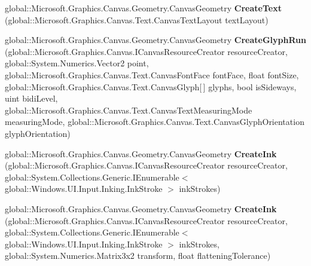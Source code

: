 \begin{DoxyCompactItemize}
\item 
\mbox{\label{interface_microsoft_1_1_graphics_1_1_canvas_1_1_geometry_1_1_i_canvas_geometry_statics_ae56dd9130aab9eb22ebd8e54fc87396e}} 
global\+::\+Microsoft.\+Graphics.\+Canvas.\+Geometry.\+Canvas\+Geometry {\bfseries Create\+Text} (global\+::\+Microsoft.\+Graphics.\+Canvas.\+Text.\+Canvas\+Text\+Layout text\+Layout)
\item 
\mbox{\label{interface_microsoft_1_1_graphics_1_1_canvas_1_1_geometry_1_1_i_canvas_geometry_statics_a8f9a378b73b213c3e0922eb74c733547}} 
global\+::\+Microsoft.\+Graphics.\+Canvas.\+Geometry.\+Canvas\+Geometry {\bfseries Create\+Glyph\+Run} (global\+::\+Microsoft.\+Graphics.\+Canvas.\+I\+Canvas\+Resource\+Creator resource\+Creator, global\+::\+System.\+Numerics.\+Vector2 point, global\+::\+Microsoft.\+Graphics.\+Canvas.\+Text.\+Canvas\+Font\+Face font\+Face, float font\+Size, global\+::\+Microsoft.\+Graphics.\+Canvas.\+Text.\+Canvas\+Glyph\mbox{[}$\,$\mbox{]} glyphs, bool is\+Sideways, uint bidi\+Level, global\+::\+Microsoft.\+Graphics.\+Canvas.\+Text.\+Canvas\+Text\+Measuring\+Mode measuring\+Mode, global\+::\+Microsoft.\+Graphics.\+Canvas.\+Text.\+Canvas\+Glyph\+Orientation glyph\+Orientation)
\item 
\mbox{\label{interface_microsoft_1_1_graphics_1_1_canvas_1_1_geometry_1_1_i_canvas_geometry_statics_a088a8471e98beba079ac4f1fdb7c630d}} 
global\+::\+Microsoft.\+Graphics.\+Canvas.\+Geometry.\+Canvas\+Geometry {\bfseries Create\+Ink} (global\+::\+Microsoft.\+Graphics.\+Canvas.\+I\+Canvas\+Resource\+Creator resource\+Creator, global\+::\+System.\+Collections.\+Generic.\+I\+Enumerable$<$ global\+::\+Windows.\+U\+I.\+Input.\+Inking.\+Ink\+Stroke $>$ ink\+Strokes)
\item 
\mbox{\label{interface_microsoft_1_1_graphics_1_1_canvas_1_1_geometry_1_1_i_canvas_geometry_statics_a339073000d1d1a908f60c234f50d7966}} 
global\+::\+Microsoft.\+Graphics.\+Canvas.\+Geometry.\+Canvas\+Geometry {\bfseries Create\+Ink} (global\+::\+Microsoft.\+Graphics.\+Canvas.\+I\+Canvas\+Resource\+Creator resource\+Creator, global\+::\+System.\+Collections.\+Generic.\+I\+Enumerable$<$ global\+::\+Windows.\+U\+I.\+Input.\+Inking.\+Ink\+Stroke $>$ ink\+Strokes, global\+::\+System.\+Numerics.\+Matrix3x2 transform, float flattening\+Tolerance)

\end{DoxyCompactItemize}
